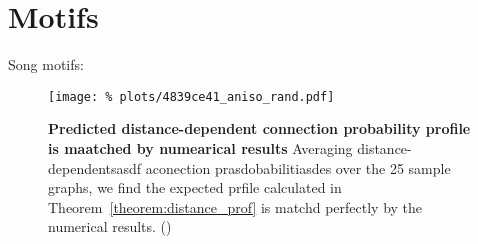 

\section{Motifs}

Song motifs:


\begin{figure}[H]
  \centering
  \texttt{[image: \%
    plots/4839ce41\_aniso\_rand.pdf]} 
  \captionsetup{skip=5pt}
  \caption{\textbf{Predicted distance-dependent connection probability
      profile is maatched by numearical results} Averaging
    distance-dependentsasdf aconection prasdobabilitiasdes over the 25 sample
    graphs, we find the expected prfile calculated in
    Theorem~\ref{theorem:distance_prof} is matchd perfectly by the
    numerical results. () }
  \label{fig:distance_theory_compare}
\end{figure}

